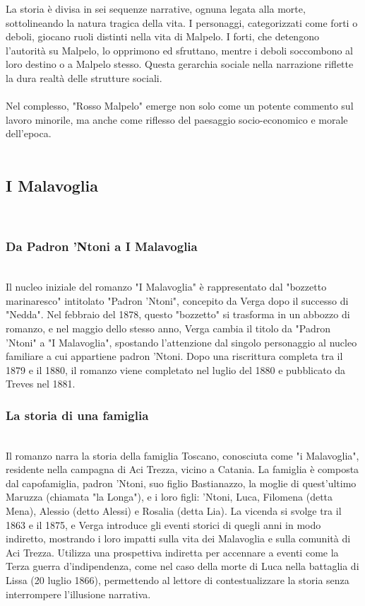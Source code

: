 \documentclass{report}
\begin{document}
La storia è divisa in sei sequenze narrative, ognuna legata alla morte, sottolineando la natura tragica della vita. I personaggi, categorizzati come forti o deboli, giocano ruoli distinti nella vita di Malpelo. I forti, che detengono l'autorità su Malpelo, lo opprimono ed sfruttano, mentre i deboli soccombono al loro destino o a Malpelo stesso. Questa gerarchia sociale nella narrazione riflette la dura realtà delle strutture sociali.
\\
\\
Nel complesso, "Rosso Malpelo" emerge non solo come un potente commento sul lavoro minorile, ma anche come riflesso del paesaggio socio-economico e morale dell'epoca.
\\
\newpage
\\
\subsection{I Malavoglia}
\\
\subsubsection{Da Padron ’Ntoni a I Malavoglia}
\\
Il nucleo iniziale del romanzo "I Malavoglia" è rappresentato dal "bozzetto marinaresco" intitolato "Padron ’Ntoni", concepito da Verga dopo il successo di "Nedda". Nel febbraio del 1878, questo "bozzetto" si trasforma in un abbozzo di romanzo, e nel maggio dello stesso anno, Verga cambia il titolo da "Padron ’Ntoni" a "I Malavoglia", spostando l'attenzione dal singolo personaggio al nucleo familiare a cui appartiene padron ’Ntoni. Dopo una riscrittura completa tra il 1879 e il 1880, il romanzo viene completato nel luglio del 1880 e pubblicato da Treves nel 1881.
\\
\subsubsection{La storia di una famiglia}
\\
Il romanzo narra la storia della famiglia Toscano, conosciuta come "i Malavoglia", residente nella campagna di Aci Trezza, vicino a Catania. La famiglia è composta dal capofamiglia, padron ’Ntoni, suo figlio Bastianazzo, la moglie di quest'ultimo Maruzza (chiamata "la Longa"), e i loro figli: ’Ntoni, Luca, Filomena (detta Mena), Alessio (detto Alessi) e Rosalia (detta Lia). La vicenda si svolge tra il 1863 e il 1875, e Verga introduce gli eventi storici di quegli anni in modo indiretto, mostrando i loro impatti sulla vita dei Malavoglia e sulla comunità di Aci Trezza. Utilizza una prospettiva indiretta per accennare a eventi come la Terza guerra d'indipendenza, come nel caso della morte di Luca nella battaglia di Lissa (20 luglio 1866), permettendo al lettore di contestualizzare la storia senza interrompere l'illusione narrativa.
\\
\end{document}
